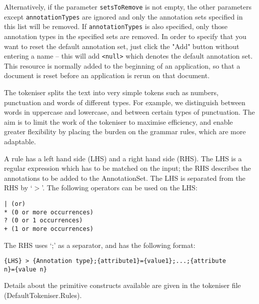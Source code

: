 Alternatively, if the parameter \texttt{setsToRemove} is not empty, 
the other parameters except \texttt{annotationTypes}  are ignored 
and only the annotation sets 
specified in this list will be removed. If \texttt{annotationTypes} is also
specified, only those annotation types in the specified sets are removed. 
In order to specify that you want to reset the default
annotation set, just click the "Add" button without entering a name --
this will add \verb|<null>| which denotes the default annotation set.
This resource is normally added to the beginning of an application, so
that a document is reset before an application is rerun on that document.




The tokeniser splits the text into very simple tokens such as numbers,
punctuation and words of different types. For example, we distinguish
between words in uppercase and lowercase, and between certain types of
punctuation. The aim is to limit the work of the tokeniser to maximise efficiency, and
enable greater flexibility by placing the burden on the grammar rules,
which are more adaptable.

A rule has a left hand side (LHS) and a right hand side (RHS).
The LHS is a regular expression which has to be matched on the input;
the RHS describes the annotations to be added to the AnnotationSet.
The LHS is separated from the RHS by `$>$'.
The following operators can be used on the LHS:
\begin{small}
\begin{verbatim}
| (or)
* (0 or more occurrences)
? (0 or 1 occurrences)
+ (1 or more occurrences)
\end{verbatim}
\end{small}

\noindent
The RHS uses `;' as a separator, and has the following format:
\begin{small}
\begin{verbatim}
{LHS} > {Annotation type};{attribute1}={value1};...;{attribute
n}={value n}
\end{verbatim}
\end{small}

\noindent
Details about the primitive constructs available are given in the
tokeniser file (DefaultTokeniser.Rules).\\

